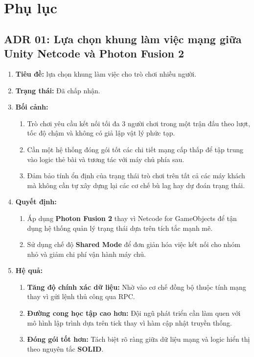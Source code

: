\section{Phụ lục}
\subsection{ADR 01: Lựa chọn khung làm việc mạng giữa Unity Netcode và Photon Fusion 2} \label{adr:01}

\begin{enumerate}
	\item \textbf{Tiêu đề:} lựa chọn khung làm việc cho trò chơi nhiều người.
	\item \textbf{Trạng thái:} Đã chấp nhận.
	\item \textbf{Bối cảnh:}
	\begin{enumerate}
		\item Trò chơi yêu cầu kết nối tối đa 3 người chơi trong một trận đấu theo lượt, tốc độ chậm và không có giả lập vật lý phức tạp.
		\item Cần một hệ thống đóng gói tốt các chi tiết mạng cấp thấp để tập trung vào logic thẻ bài và tương tác với máy chủ phía sau.
		\item Đảm bảo tính ổn định của trạng thái trò chơi trên tất cả các máy khách mà không cần tự xây dựng lại các cơ chế bù lag hay dự đoán trạng thái.
	\end{enumerate}
	\item \textbf{Quyết định:}
	\begin{enumerate}
		\item Áp dụng \textbf{Photon Fusion 2} thay vì Netcode for GameObjects để tận dụng hệ thống quản lý trạng thái dựa trên tích tắc mạnh mẽ.
		\item Sử dụng chế độ \textbf{Shared Mode} để đơn giản hóa việc kết nối cho nhóm nhỏ và giảm chi phí vận hành máy chủ.
	\end{enumerate}
	\item \textbf{Hệ quả:}
	\begin{enumerate}
		\item \textbf{Tăng độ chính xác dữ liệu:} Nhờ vào cơ chế đồng bộ thuộc tính mạng thay vì gửi lệnh thủ công qua RPC.
		\item \textbf{Đường cong học tập cao hơn:} Đội ngũ phát triển cần làm quen với mô hình lập trình dựa trên tick thay vì hàm cập nhật truyền thống.
		\item \textbf{Đóng gói tốt hơn:} Tách biệt rõ ràng giữa dữ liệu mạng và logic hiển thị theo nguyên tắc \textbf{SOLID}.
	\end{enumerate}
\end{enumerate}

